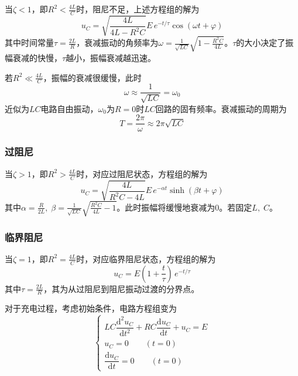 \documentclass[UTF8]{article}
\theoremstyle{MyLineTheoremStyle} %
\theoremstyle{MyBlockTheoremStyle} %
\theoremstyle{MySubsubsectionStyle} %
\begin{document}
当$ \zeta<1 $，即$ R^2<\frac{4L}{C} $时，阻尼不足，上述方程组的解为
\begin{equation}
u_C=\sqrt{\frac{4L}{4L-R^2C}}E\,e^{-t/\tau}\cos(\omega t+\varphi)
\end{equation}
其中时间常量$ \tau=\frac{2L}{R} $，衰减振动的角频率为$ \omega=\frac{1}{\sqrt{LC}}\sqrt{1-\frac{R^2C}{4L}} $。$ \tau $的大小决定了振幅衰减的快慢，$ \tau $越小，振幅衰减越迅速。

若$ R^2\ll\frac{4L}{C} $，振幅的衰减很缓慢，此时
\begin{equation}
\omega\approx\frac{1}{\sqrt{LC}}=\omega_0
\end{equation}
近似为$ LC $电路自由振动，$ \omega_0 $为$ R=0 $时$ LC $回路的固有频率。衰减振动的周期为
\begin{equation}
T=\frac{2\pi}{\omega}\approx2\pi\sqrt{LC}
\end{equation}


\subsubsection{过阻尼}
当$ \zeta>1 $，即$ R^2>\frac{4L}{C} $时，对应过阻尼状态，方程组的解为
\begin{equation}
u_C=\sqrt{\frac{4L}{R^2C-4L}}E\,e^{-\alpha t}\sinh(\beta t+\varphi)
\end{equation}
其中$ \alpha=\frac{R}{2L},\;\beta=\frac{1}{\sqrt{LC}}\sqrt{\frac{R^2C}{4L}-1} $。此时振幅将缓慢地衰减为0。若固定$ L,\;C $。

\subsubsection{临界阻尼}

当$ \zeta=1 $，即$ R^2=\frac{4L}{C} $时，对应临界阻尼状态，方程组的解为
\begin{equation}
u_C=E\left(1+\frac t\tau\right)\,e^{-t/\tau}
\end{equation}
其中$ \tau=\frac{2L}{R} $，其为从过阻尼到阻尼振动过渡的分界点。

对于充电过程，考虑初始条件，电路方程组变为
\begin{equation}
\begin{cases}
    LC\dfrac{\mathrm{d}^2u_C}{\mathrm{d} t^2}+RC\dfrac{\mathrm{d} u_C}{\mathrm{d} t}+u_C=E\\
    u_C=0\qquad(t=0)\\
    \dfrac{\mathrm{d} u_C}{\mathrm{d} t}=0\qquad(t=0)
\end{cases}
\end{equation}
\end{document}

